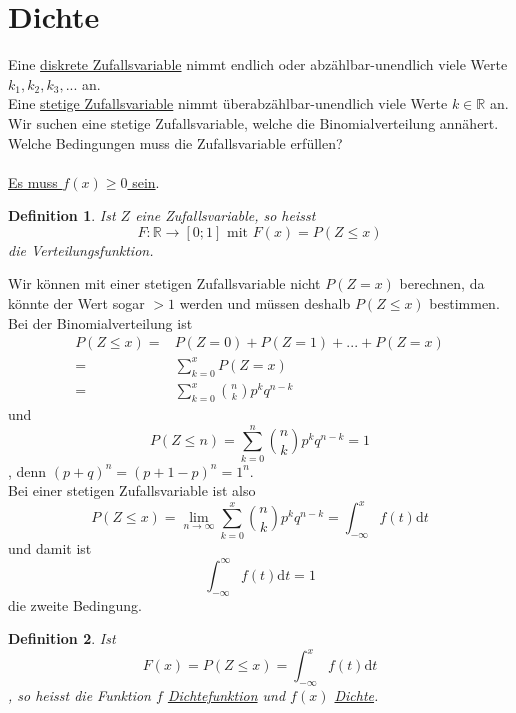 \documentclass{report}
\newtheorem{mydef}{Definition}
\begin{document}
\section{Dichte}
Eine \underline{diskrete Zufallsvariable} nimmt endlich oder abzählbar-unendlich viele Werte $k_1, k_2, k_3, ...$ an.\\
Eine \underline{stetige Zufallsvariable} nimmt überabzählbar-unendlich viele Werte $k \in \mathbb{R}$ an.\\
Wir suchen eine stetige Zufallsvariable, welche die Binomialverteilung annähert.\\
Welche Bedingungen muss die Zufallsvariable erfüllen?
\\\\
\underline{Es muss $f(x) \geq 0$ sein}.
\begin{mydef}
Ist $Z$ eine Zufallsvariable, so heisst
\begin{equation}
F: \mathbb{R} \longrightarrow [0;1] \mbox{ mit } F(x) = P(Z \leq x)
\end{equation}
die Verteilungsfunktion.
\end{mydef}
Wir können mit einer stetigen Zufallsvariable nicht $P(Z=x)$ berechnen, da könnte der Wert sogar $>1$ werden und müssen deshalb $P(Z \leq x)$ bestimmen. Bei der Binomialverteilung ist
\begin{align*}
P(Z \leq x) =  & P(Z=0) + P(Z=1) + ... + P(Z=x)\\
= & \sum_{k=0}^x{P(Z=x)}\\
= & \sum_{k=0}^x{\binom{n}{k} p^k q^{n-k}}
\end{align*}
und
\begin{equation}
P(Z \leq n) =  \sum_{k=0}^n{\binom{n}{k} p^k q^{n-k}} = 1
\end{equation}
, denn $(p+q)^n = (p+1-p)^n = 1^n$.\\
Bei einer stetigen Zufallsvariable ist also
\begin{equation}
P(Z \leq x) = \lim_{n \to \infty}{\sum_{k=0}^x{\binom{n}{k} p^k q^{n-k}}} = \int_{-\infty}^{x}{f(t)} \mathrm{d}t
\end{equation}
und damit ist
\begin{equation}
\int_{-\infty}^{\infty}{f(t)}\mathrm{d}t = 1
\end{equation}
die zweite Bedingung.
\begin{mydef}
Ist
\begin{equation}
F(x) = P(Z \leq x) = \int_{-\infty}^{x}{f(t)} \mathrm{d}t
\end{equation}
, so heisst die Funktion $f$ \underline{Dichtefunktion} und $f(x)$ \underline{Dichte}.
\end{mydef}
\end{document}
